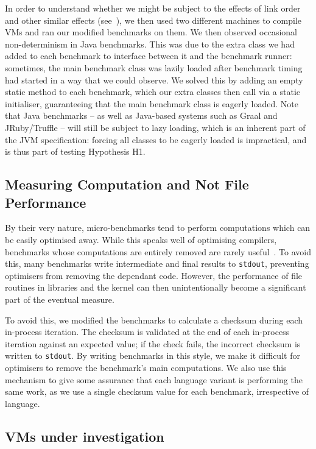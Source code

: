 \documentclass[preprint,numbers,10pt]{sigplanconf}
\begin{document}
In order to understand whether we might be subject to the effects of link
order and other similar effects (see~\cite{mytkowicz09surprising}),
we then used two different machines to compile VMs and ran our modified benchmarks
on them. We then observed occasional non-determinism in Java benchmarks.
This was due to the extra class we had added to each benchmark
to interface between it and the benchmark runner: sometimes, the
main benchmark class was lazily loaded after benchmark timing had started in a
way that we could observe. We
solved this by adding an empty static method to each benchmark, which our
extra classes then call via a static initialiser, guaranteeing that
the main benchmark class is eagerly loaded. Note that Java
benchmarks -- as well as
Java-based systems such as Graal and JRuby/Truffle -- will still be subject to
lazy loading, which is an inherent part of the JVM specification: forcing all
classes to be eagerly loaded is impractical, and is thus part of testing
Hypothesis H1.


\subsection{Measuring Computation and Not File Performance}

By their very nature, micro-benchmarks tend to perform computations which
can be easily optimised away. While this speaks well of
optimising compilers, benchmarks whose computations
are entirely removed are rarely useful~\cite{seaton15phd}. To avoid this,
many benchmarks write intermediate and final results
to \texttt{stdout}, preventing optimisers from removing the dependant code.
However, the performance of file routines in libraries and the kernel can then
unintentionally become a significant part of the eventual measure.

To avoid this, we modified the benchmarks to calculate a checksum
during each in-process iteration.
The checksum is validated at the end of each in-process iteration against an expected
value; if the check fails, the incorrect checksum is written to \texttt{stdout}.
By writing benchmarks in
this style, we make it difficult for optimisers to remove the
benchmark's main computations. We also use this mechanism to give some assurance
that each language variant is performing the same work, as we use a single
checksum value for each benchmark, irrespective of language.


\subsection{VMs under investigation}
\end{document}
